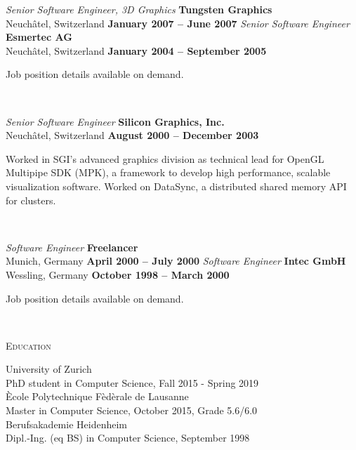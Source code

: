 \parbox[t]{2.5cm}{\hspace{1pt}}
\parbox[t]{12.5cm}{
  {\em Senior Software Engineer, 3D Graphics} \hfill {\bf Tungsten Graphics}\\
  Neuch\^atel, Switzerland  \hfill {\bf January 2007 -- June 2007}\exrule
  {\em Senior Software Engineer} \hfill {\bf Esmertec AG}\\
  Neuch\^atel, Switzerland  \hfill {\bf January 2004 -- September 2005}\exrule

  Job position details available on demand.
}\\

\parbox[t]{2.5cm}{\hspace{1pt}}
\parbox[t]{12.5cm}{
  {\em Senior Software Engineer}  \hfill {\bf Silicon Graphics, Inc.}\\
  Neuch\^atel, Switzerland \hfill {\bf August 2000 -- December 2003}\exrule

  Worked in SGI's advanced graphics division as technical lead for OpenGL
  Multipipe SDK (MPK), a framework to develop high performance, scalable
  visualization software. Worked on DataSync, a distributed shared memory API
  for clusters.  }\\

\parbox[t]{2.5cm}{\hspace{1pt}}
\parbox[t]{12.5cm}{
  {\em Software Engineer} \hfill {\bf Freelancer}\\
  Munich, Germany         \hfill {\bf April 2000 -- July 2000}\exrule
  {\em Software Engineer} \hfill {\bf Intec GmbH}\\
  Wessling, Germany       \hfill {\bf October 1998 -- March 2000}\exrule

  Job position details available on demand.
}\vspace{1em}\\

\parbox[t]{2.5cm}{\scshape Education}
\parbox[t]{12.5cm}{
  University of Zurich\\
  PhD student in Computer Science, Fall 2015 - Spring 2019
  \vspace{.3em}\\
  \`Ecole Polytechnique F\`ed\`erale de Lausanne\\
  Master in Computer Science, October 2015, Grade 5.6/6.0
  \vspace{.3em}\\
  Berufsakademie Heidenheim\\
  Dipl.-Ing. (eq BS) in Computer Science, September 1998
}\vspace{1em}